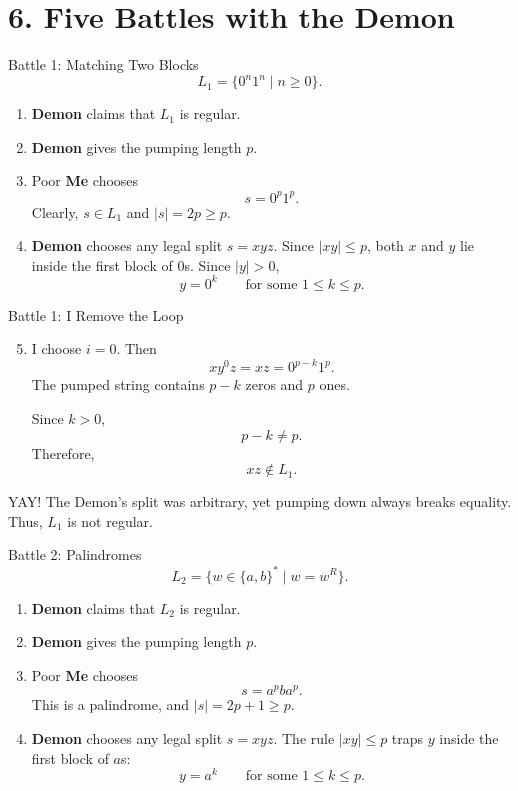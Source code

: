\documentclass[10pt,aspectratio=169]{beamer}
\newcommand{\Demon}{\textbf{\alert{Demon}}}
\newcommand{\Me}{\textbf{\color{blue!70!black}Me}}
\begin{document}
\section{6. Five Battles with the Demon}

\begin{frame}{Battle 1: Matching Two Blocks}
\small
\[
L_1=\{0^n1^n\mid n\geq 0\}.
\]

\begin{enumerate}
    \item \Demon{} claims that $L_1$ is regular.
    \item \Demon{} gives the pumping length $p$.
    \item Poor \Me{} chooses
    \[
    s=0^p1^p.
    \]
    Clearly, $s\in L_1$ and $|s|=2p\geq p$.
    \item \Demon{} chooses any legal split $s=xyz$.
          Since $|xy|\leq p$, both $x$ and $y$ lie inside the first
          block of $0$s. Since $|y|>0$,
    \[
    y=0^k
    \qquad\text{for some }1\leq k\leq p.
    \]
\end{enumerate}
\end{frame}

\begin{frame}{Battle 1: I Remove the Loop}
\small
\begin{enumerate}
    \setcounter{enumi}{4}
    \item I choose $i=0$. Then
    \[
    xy^0z=xz=0^{p-k}1^p.
    \]
    The pumped string contains $p-k$ zeros and $p$ ones.

    Since $k>0$,
    \[
    p-k\neq p.
    \]
    Therefore,
    \[
    xz\notin L_1.
    \]
\end{enumerate}

\begin{block}{YAY!}
The Demon's split was arbitrary, yet pumping down always breaks equality.
Thus, $L_1$ is not regular.
\end{block}
\end{frame}

\begin{frame}{Battle 2: Palindromes}
\small
\[
L_2=\{w\in\{a,b\}^*\mid w=w^R\}.
\]

\begin{enumerate}
    \item \Demon{} claims that $L_2$ is regular.
    \item \Demon{} gives the pumping length $p$.
    \item Poor \Me{} chooses
    \[
    s=a^pba^p.
    \]
    This is a palindrome, and $|s|=2p+1\geq p$.
    \item \Demon{} chooses any legal split $s=xyz$.
          The rule $|xy|\leq p$ traps $y$ inside the first block of $a$s:
    \[
    y=a^k
    \qquad\text{for some }1\leq k\leq p.
    \]
\end{enumerate}
\end{frame}
\end{document}
